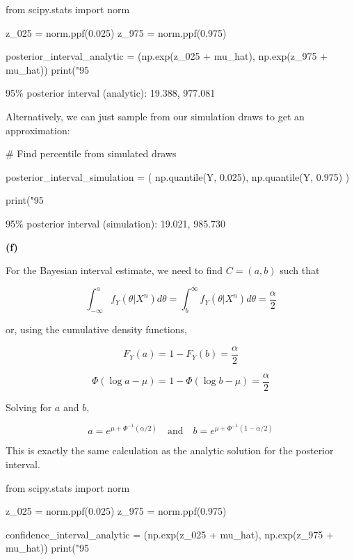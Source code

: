 \begin{python}
from scipy.stats import norm

z_025 = norm.ppf(0.025)
z_975 = norm.ppf(0.975)

posterior_interval_analytic = (np.exp(z_025 + mu_hat), np.exp(z_975 + mu_hat))
print("95%
\end{python}

\begin{console}
95\% posterior interval (analytic):  19.388, 977.081
\end{console}

Alternatively, we can just sample from our simulation draws to get an
approximation:

\begin{python}
# Find percentile from simulated draws

posterior_interval_simulation = (
    np.quantile(Y, 0.025),
    np.quantile(Y, 0.975)
)

print("95%
\end{python}

\begin{console}
95\% posterior interval (simulation):  19.021, 985.730
\end{console}

\textbf{(f)}

For the Bayesian interval estimate, we need to find \(C = (a, b)\) such
that

\[ \int_{-\infty}^a f_Y(\theta | X^n) d\theta = \int_b^\infty f_Y(\theta | X^n) d\theta = \frac{\alpha}{2}\]

or, using the cumulative density functions,

\[ F_Y(a) = 1 - F_Y(b) = \frac{\alpha}{2}\]

\[\Phi(\log a - \mu) = 1 - \Phi(\log b - \mu) = \frac{\alpha}{2}\]

Solving for \(a\) and \(b\),

\[
a = e^{\mu + \Phi^{-1}(\alpha / 2)}
\quad \text{and} \quad
b = e^{\mu + \Phi^{-1}(1 - \alpha / 2)}
\]

This is exactly the same calculation as the analytic solution for the
posterior interval.

\begin{python}
from scipy.stats import norm

z_025 = norm.ppf(0.025)
z_975 = norm.ppf(0.975)

confidence_interval_analytic = (np.exp(z_025 + mu_hat), np.exp(z_975 + mu_hat))
print("95%
\end{python}

